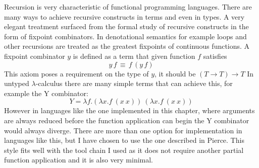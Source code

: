 \documentclass[12pt,twoside,notitlepage]{report}
\begin{document}
Recursion is very characteristic of functional programming languages. There are many ways to achieve recursive constructs in terms and even in types. A very elegant treatment surfaced from the formal study of recursive constructs in the form of fixpoint combinators. In denotational semantics for example loops and other recursions are treated as the greatest fixpoints of continuous functions. A fixpoint combinator $ y $ is defined as a term that given function $ f $ satisfies
\[ y\,f\,\equiv\, f\,(y\,f) \] 
This axiom poses a requirement on the type of $ y $, it should be $ (T \rightarrow T) \rightarrow T $
In untyped $ \lambda $-calculus there are many simple terms that can achieve this, for example the Y combinator:
\[ Y = \lambda f.(\lambda x.f\ (x\ x))\ (\lambda x.f\ (x\ x))  \]
However in languages like the one implemented in this chapter, where arguments are always reduced before the function application can begin the Y combinator would always diverge. There are more than one option for implementation in languages like this, but I have chosen to use the one described in Pierce\cite[p.~144]{pierce2002types}. This style fits well with the tool chain I used as it does not require another partial function application and it is also very minimal.
\end{document}
